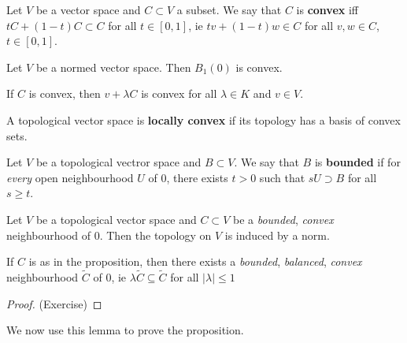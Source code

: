 \documentclass{article}
\begin{document}
\begin{defi}
    Let $V$ be a vector space and $C \subset V$ a subset.  We say that $C$ is \textbf{convex} iff $t C + (1-t) C \subset C$ for all $t \in [0, 1]$, ie $t v + (1-t) w \in C$ for all $v, w \in C$, $t \in [0, 1]$.
\end{defi}
\begin{fact}
    Let $V$ be a normed vector space. Then $B_1(0)$ is convex.
\end{fact}
\begin{fact}
    If $C$ is convex, then $v + \lambda C$ is convex for all $\lambda \in K$ and $v \in V$.
\end{fact}
\begin{defi}
    A topological vector space is \textbf{locally convex} if its topology has a basis of convex sets.
\end{defi}
\begin{defi}
    Let $V$ be a topological vectror space and $B \subset V$. We say that $B$ is \textbf{bounded} if for \textit{every} open neighbourhood $U$ of $0$, there exists $t > 0$ such that $s U \supset B$ for all $s \geq t$.
\end{defi}
\begin{prop}
    Let $V$ be a topological vector space and $C \subset V$ be a \emph{bounded}, \emph{convex} neighbourhood of $0$. Then the topology on $V$ is induced by a norm.
\end{prop}
\begin{lemma}
    If $C$ is as in the proposition, then there exists a \emph{bounded}, \emph{balanced}, \emph{convex} neighbourhood $\tilde C$ of $0$, ie $\lambda \tilde C \subseteq \tilde C$ for all $|\lambda| \leq 1$
\end{lemma}
\begin{proof}
    (Exercise)
\end{proof}
We now use this lemma to prove the proposition.
\end{document}
